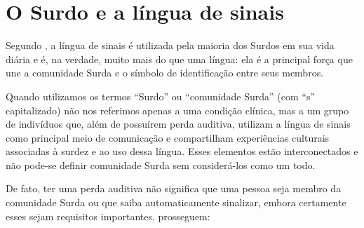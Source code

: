 \section{O Surdo e a língua de sinais}
\label{sec:lingua-sinais}

Segundo , a língua de sinais é utilizada pela maioria dos Surdos em sua vida diária e é, na verdade, muito mais do que uma língua: ela é a principal força que une a comunidade Surda e o símbolo de identificação entre seus membros.



Quando utilizamos os termos ``Surdo'' ou ``comunidade Surda'' (com ``s'' capitalizado) não nos referimos apenas a uma condição clínica, mas a um grupo de indivíduos que, além de possuírem perda auditiva, utilizam a língua de sinais como principal meio de comunicação e compartilham experiências culturais associadas à surdez e ao uso dessa língua. Esses elementos estão interconectados e não pode-se definir comunidade Surda sem considerá-los como um todo.

De fato, ter uma perda auditiva não significa que uma pessoa seja membro da comunidade Surda ou que saiba automaticamente sinalizar, embora certamente esses sejam requisitos importantes.  prosseguem:



